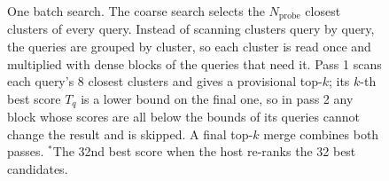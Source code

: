 \begin{figure}[htbp]
{}
\caption{One batch search. The coarse search selects the \(N_{\mathrm{probe}}\)
closest clusters of every query. Instead of scanning clusters query by query,
the queries are grouped by cluster, so each cluster is read once and multiplied
with dense blocks of the queries that need it. Pass 1 scans each query's 8
closest clusters and gives a provisional top-\(k\); its \(k\)-th best score
\(T_q\) is a lower bound on the final one, so in pass 2 any block whose scores
are all below the bounds of its queries cannot change the result and is
skipped. A final top-\(k\) merge combines both passes. \(^{*}\)The 32nd best score
when the host re-ranks the 32 best candidates.}
\label{fig:gf-algorithm}
\end{figure}

